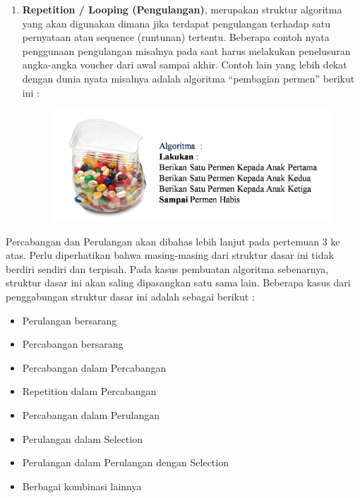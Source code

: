 \begin{enumerate}
	\item \textbf{Repetition / Looping (Pengulangan)}, merupakan struktur algoritma yang akan digunakan dimana jika terdapat pengulangan terhadap satu pernyataan atau sequence (runtunan) tertentu. Beberapa contoh nyata penggunaan pengulangan misalnya pada saat harus melakukan penelusuran angka-angka voucher dari awal sampai akhir. Contoh lain yang lebih dekat dengan dunia nyata misalnya adalah algoritma “pembagian permen” berikut ini :
		\begin{figure}
		\centering
		\includegraphics[scale=0.4]{fig/1/Gambar15.png}	
		\end{figure}
\end{enumerate}

Percabangan dan Perulangan akan dibahas lebih lanjut pada pertemuan 3 ke atas. Perlu diperhatikan bahwa masing-masing dari struktur dasar ini tidak berdiri sendiri dan terpisah. Pada kasus pembuatan algoritma sebenarnya, struktur dasar ini akan saling dipasangkan satu sama lain. Beberapa kasus dari penggabungan struktur dasar ini adalah sebagai berikut : 
\begin{itemize}
	\item Perulangan bersarang
	\item	Percabangan bersarang
	\item	Percabangan dalam Percabangan 
	\item	Repetition dalam Percabangan 
	\item	Percabangan dalam Perulangan 
	\item	Perulangan dalam Selection
	\item	Perulangan dalam Perulangan dengan Selection
	\item	Berbagai kombinasi lainnya
\end{itemize}


